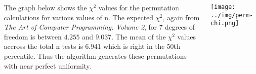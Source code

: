 \documentclass[24pt, a0paper, landscape]{tikzposter}
\begin{document}
\begin{columns}
{\begin{minipage}{0.175\textwidth}
The graph below shows the $\chi^2$ values for the permutation calculations for various values of n. The expected $\chi^2$, again from \textit{The Art of Computer Programming: Volume 2}, for 7 degrees of freedom is between $4.255$ and $9.037$. The mean of the $\chi^2$ values accross the total n tests is $6.941$ which is right in the 50th percentile. Thus the algorithm generates these permutations with near perfect uniformity.
\end{minipage}
\begin{minipage}{0.175\textwidth}
	\begin{tikzfigure}
		\texttt{[image: ../img/perm-chi.png]}
	\end{tikzfigure}
\end{minipage}
}

\end{columns}
\end{document}
